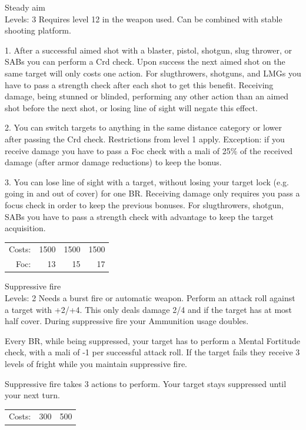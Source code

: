 \begin{skill}{Steady aim \\\phantom{a}\hfill Levels: 3}
	\setlength{\parskip}{8pt}
	\setlength{\parindent}{0pt}
	Requires level 12 in the weapon used. Can be combined with stable shooting platform.

	1. After a successful aimed shot with a blaster, pistol, shotgun, slug thrower, or SABs you can perform a Crd check. Upon success the next aimed shot on the same target will only costs one action. For slugthrowers, shotguns, and LMGs you have to pass a strength check after each shot to get this benefit. Receiving damage, being stunned or blinded, performing any other action than an aimed shot before the next shot, or losing line of sight will negate this effect.

	2. You can switch targets to anything in the same distance category or lower after passing the Crd check. Restrictions from level 1 apply. Exception: if you receive damage you have to pass a Foc check with a mali of 25\% of the received damage (after armor damage reductions) to keep the bonus.

	3. You can lose line of sight with a target, without losing your target lock (e.g. going in and out of cover) for one BR. Receiving damage only requires you pass a focus check in order to keep the previous bonuses. For slugthrowers, shotgun, SABs you have to pass a strength check with advantage to keep the target acquisition.\\

	\hfill
	\begin{tabular}{rrrr}
		Costs: & 1500 & 1500 & 1500 \\
		Foc: & 13 & 15 & 17 \\
	\end{tabular}
\end{skill}

\begin{skill}{Suppressive fire \\\phantom{a}\hfill Levels: 2}
	\setlength{\parskip}{8pt}
	\setlength{\parindent}{0pt}
	Needs a burst fire or automatic weapon. Perform an attack roll against a target with +2/+4. This only deals damage 2/4 and if the target has at most half cover. During suppressive fire your Ammunition usage doubles.

	Every BR, while being suppressed, your target has to perform a Mental Fortitude check, with a mali of -1 per successful attack roll. If the target fails they receive 3 levels of fright while you maintain suppressive fire.

	Suppressive fire takes 3 actions to perform. Your target stays suppressed until your next turn.\\

	\hfill
	\begin{tabular}{rrr}
		Costs: & 300 & 500 \\
	\end{tabular}
\end{skill}

